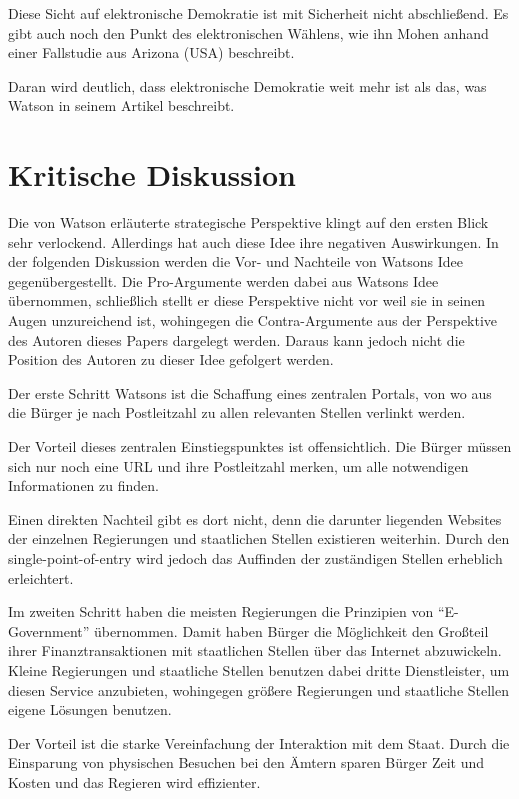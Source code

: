 \documentclass[12pt,twoside,ngerman]{scrartcl}
\theoremstyle{plain}
\theoremstyle{definition}
\theoremstyle{remark}
\begin{document}
	Diese Sicht auf elektronische Demokratie ist mit Sicherheit nicht abschließend. Es gibt auch noch den Punkt des elektronischen Wählens, wie ihn Mohen\cite{Mohen2001} anhand einer Fallstudie aus Arizona (USA) beschreibt.
	
	Daran wird deutlich, dass elektronische Demokratie weit mehr ist als das, was Watson in seinem Artikel beschreibt.
	
\section{Kritische Diskussion}
\label{sec:critDisc}

	Die von Watson\cite{Watson2001} erläuterte strategische Perspektive klingt auf den ersten Blick sehr verlockend. Allerdings hat auch diese Idee ihre negativen Auswirkungen. In der folgenden Diskussion werden die Vor- und Nachteile von Watsons Idee gegenübergestellt. Die Pro-Argumente werden dabei aus Watsons Idee übernommen, schließlich stellt er diese Perspektive nicht vor weil sie in seinen Augen unzureichend ist, wohingegen die Contra-Argumente aus der Perspektive des Autoren dieses Papers dargelegt werden. Daraus kann jedoch nicht die Position des Autoren zu dieser Idee gefolgert werden.
	
	Der erste Schritt Watsons ist die Schaffung eines zentralen Portals, von wo aus die Bürger je nach Postleitzahl zu allen relevanten Stellen verlinkt werden. 
	
	Der Vorteil dieses zentralen Einstiegspunktes ist offensichtlich. Die Bürger müssen sich nur noch eine URL und ihre Postleitzahl merken, um alle notwendigen Informationen zu finden.
	
	Einen direkten Nachteil gibt es dort nicht, denn die darunter liegenden Websites der einzelnen Regierungen und staatlichen Stellen existieren weiterhin. Durch den single-point-of-entry wird jedoch das Auffinden der zuständigen Stellen erheblich erleichtert.
	
	Im zweiten Schritt haben die meisten Regierungen die Prinzipien von "`E-Government"' übernommen. Damit haben Bürger die Möglichkeit den Großteil ihrer Finanztransaktionen mit staatlichen Stellen über das Internet abzuwickeln. Kleine Regierungen und staatliche Stellen benutzen dabei dritte Dienstleister, um diesen Service anzubieten, wohingegen größere Regierungen und staatliche Stellen eigene Lösungen benutzen.
	
	Der Vorteil ist die starke Vereinfachung der Interaktion mit dem Staat. Durch die Einsparung von physischen Besuchen bei den Ämtern sparen Bürger Zeit und Kosten und das Regieren wird effizienter.
	
\end{document}
